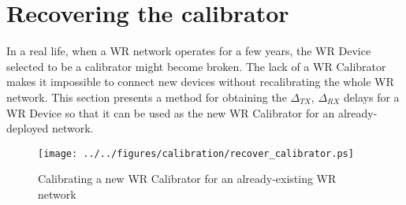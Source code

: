 \section{Recovering the calibrator}

In a real life, when a WR network operates for a few years, the WR Device selected
to be a calibrator might become broken. The lack of a WR Calibrator makes it
impossible to connect new devices without recalibrating the whole WR network.
This section presents a method for obtaining the $\Delta_{TX}$, $\Delta_{RX}$
delays for a WR Device so that it can be used as the new WR Calibrator for an
already-deployed network.

\begin{figure}[ht]
	\begin{center}
	\texttt{[image: ../../figures/calibration/recover\_calibrator.ps]}
	\caption{Calibrating a new WR Calibrator for an already-existing WR network}
	\label{fig:recover_calibrator}
	\end{center}
\end{figure}

